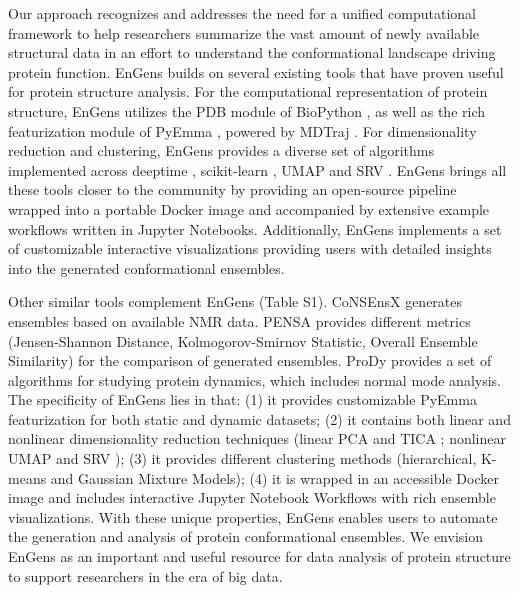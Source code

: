 \documentclass[unnumsec,webpdf,contemporary,large,numsquare]{oup-authoring-template}%
\theoremstyle{thmstyleone}%
\theoremstyle{thmstyletwo}%
\theoremstyle{thmstylethree}%
\begin{document}
Our approach recognizes and addresses the need for a unified computational framework to help researchers summarize the vast amount of newly available structural data in an effort to understand the conformational landscape driving protein function. EnGens builds on several existing tools that have proven useful for protein structure analysis. For the computational representation of protein structure, EnGens utilizes the PDB module of BioPython \citep{cock_biopython_2009}, as well as the rich featurization module of PyEmma \citep{scherer_pyemma_2015}, powered by MDTraj \citep{mcgibbon_mdtraj_2015}. For dimensionality reduction and clustering, EnGens provides a diverse set of algorithms implemented across deeptime \citep{hoffmann_deeptime_2021}, scikit-learn \citep{pedregosa_scikit-learn_2011}, UMAP \citep{trozzi_umap_2021} and SRV \citep{chen_nonlinear_2019}. EnGens brings all these tools closer to the community by providing an open-source pipeline wrapped into a portable Docker image and accompanied by extensive example workflows written in Jupyter Notebooks. Additionally, EnGens implements a set of customizable interactive visualizations providing users with detailed insights into the generated conformational ensembles.

Other similar tools complement EnGens (Table S1). CoNSEnsX \citep{angyan_consensx_2010} generates ensembles based on available NMR data. PENSA \citep{vogele_systematic_2022, vogele_drorlabpensa_2022} provides different metrics (Jensen-Shannon Distance, Kolmogorov-Smirnov Statistic, Overall Ensemble Similarity) for the comparison of generated ensembles. ProDy \citep{bakan_prody_2011, zhang_prody_2021} provides a set of algorithms for studying protein dynamics, which includes normal mode analysis. The specificity of EnGens lies in that: (1) it provides customizable PyEmma featurization for both static and dynamic datasets; (2) it contains both linear and nonlinear dimensionality reduction techniques (linear PCA \citep{pearson_liii_1901} and TICA \citep{perez-hernandez_identification_2013, schwantes_modeling_2015}; nonlinear UMAP \citep{trozzi_umap_2021} and SRV \citep{chen_nonlinear_2019}); (3) it provides different clustering methods (hierarchical, K-means and Gaussian Mixture Models); (4) it is wrapped in an accessible Docker image and includes interactive Jupyter Notebook Workflows with rich ensemble visualizations. With these unique properties, EnGens enables users to automate the generation and analysis of protein conformational ensembles. We envision EnGens as an important and useful resource for data analysis of protein structure to support researchers in the era of big data.
\end{document}
